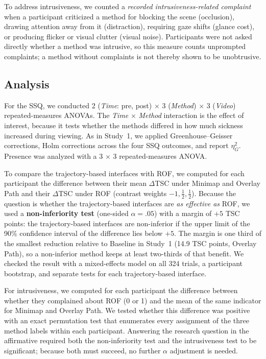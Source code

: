 To address intrusiveness, we counted a \emph{recorded intrusiveness-related
complaint} when a participant criticized a method for blocking the scene
(occlusion), drawing attention away from it (distraction), requiring gaze
shifts (glance cost), or producing flicker or visual clutter (visual noise).
Participants were not asked directly whether a method was intrusive, so this
measure counts unprompted complaints; a method without complaints is not
thereby shown to be unobtrusive.

\subsection{Analysis}

For the SSQ, we conducted 2 (\textit{Time}: pre, post) $\times$ 3
(\textit{Method}) $\times$ 3 (\textit{Video}) repeated-measures ANOVAs.
The \textit{Time} $\times$ \textit{Method} interaction is the effect of
interest, because it tests whether the methods differed in how much sickness
increased during viewing. As in Study~1, we applied Greenhouse--Geisser
corrections, Holm corrections across the four SSQ outcomes, and report
$\eta^2_G$. Presence was analyzed with a 3 $\times$ 3 repeated-measures ANOVA.

To compare the trajectory-based interfaces with ROF, we computed for each
participant the difference between their mean $\Delta$TSC under Minimap and
Overlay Path and their $\Delta$TSC under ROF (contrast weights
$-1, \frac{1}{2}, \frac{1}{2}$). Because the question is whether the
trajectory-based interfaces are \emph{as effective as} ROF, we used a
\textbf{non-inferiority test} (one-sided $\alpha = .05$) with a margin of
$+5$ TSC points: the trajectory-based interfaces are non-inferior if the upper
limit of the 90\% confidence interval of the difference lies below $+5$. The
margin is one third of the smallest reduction relative to Baseline in Study~1
(14.9 TSC points, Overlay Path), so a non-inferior method keeps at least
two-thirds of that benefit. We checked the result with a mixed-effects model on
all 324 trials, a participant bootstrap, and separate tests for each
trajectory-based interface.

For intrusiveness, we computed for each participant the difference between
whether they complained about ROF (0 or 1) and the mean of the same indicator
for Minimap and Overlay Path. We tested whether this difference was positive
with an exact permutation test that enumerates every assignment of the three
method labels within each participant. Answering the research question in the
affirmative required both the non-inferiority test and the intrusiveness test
to be significant; because both must succeed, no further $\alpha$ adjustment is
needed.

